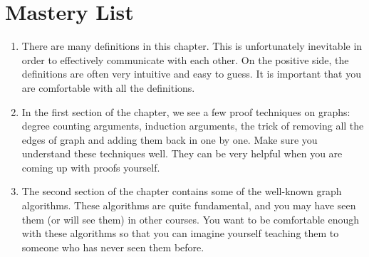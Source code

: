 \section{Mastery List}
\label{sec:intro-to-graph-theory::mastery-list}

\begin{gram}
\label{grm:intro-to-graph-theory::unfortunately}
\begin{enumerate}
    \item There are many definitions in this chapter. This is unfortunately inevitable in order to effectively communicate with each other. On the positive side, the definitions are often very intuitive and easy to guess. It is important that you are comfortable with all the definitions.

    \item In the first section of the chapter, we see a few proof techniques on graphs: degree counting arguments, induction arguments, the trick of removing all the edges of graph and adding them back in one by one. Make sure you understand these techniques well. They can be very helpful when you are coming up with proofs yourself.

    \item The second section of the chapter contains some of the well-known graph algorithms. These algorithms are quite fundamental, and you may have seen them (or will see them) in other courses. You want to be comfortable enough with these algorithms so that you can imagine yourself teaching them to someone who has never seen them before.
\end{enumerate}

\end{gram}

